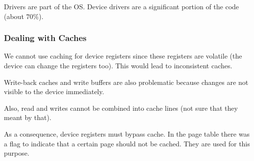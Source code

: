 Drivers are part of the OS. Device drivers are a significant portion of the code (about $70\%$).

\subsubsection{Dealing with Caches}
We cannot use caching for device registers since these registers are volatile (the device can change the registers too). This would lead to inconsistent caches.

Write-back caches and write buffers are also problematic because changes are not visible to the device immediately.

Also, read and writes cannot be combined into cache lines (not sure that they meant by that).

As a consequence, device registers must bypass cache. In the page table there was a flag to indicate that a certain page should not be cached. They are used for this purpose.
